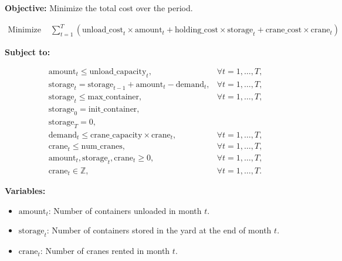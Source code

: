 \documentclass{article}
\begin{document}
\textbf{Objective:} Minimize the total cost over the period.

\begin{align*}
\text{Minimize } & \sum_{t=1}^{T} \left( \text{unload\_cost}_{t} \times \text{amount}_{t} + \text{holding\_cost} \times \text{storage}_{t} + \text{crane\_cost} \times \text{crane}_{t} \right)
\end{align*}

\textbf{Subject to:}

\begin{align*}
& \text{amount}_{t} \leq \text{unload\_capacity}_{t}, & \forall t = 1, \ldots, T, \\
& \text{storage}_{t} = \text{storage}_{t-1} + \text{amount}_{t} - \text{demand}_{t}, & \forall t = 1, \ldots, T, \\
& \text{storage}_{t} \leq \text{max\_container}, & \forall t = 1, \ldots, T, \\
& \text{storage}_{0} = \text{init\_container}, \\
& \text{storage}_{T} = 0, \\
& \text{demand}_{t} \leq \text{crane\_capacity} \times \text{crane}_{t}, & \forall t = 1, \ldots, T, \\
& \text{crane}_{t} \leq \text{num\_cranes}, & \forall t = 1, \ldots, T, \\
& \text{amount}_{t}, \text{storage}_{t}, \text{crane}_{t} \geq 0, & \forall t = 1, \ldots, T, \\
& \text{crane}_{t} \in \mathbb{Z}, & \forall t = 1, \ldots, T.
\end{align*}

\textbf{Variables:}

\begin{itemize}
    \item $\text{amount}_{t}$: Number of containers unloaded in month $t$.
    \item $\text{storage}_{t}$: Number of containers stored in the yard at the end of month $t$.
    \item $\text{crane}_{t}$: Number of cranes rented in month $t$.
\end{itemize}
\end{document}
